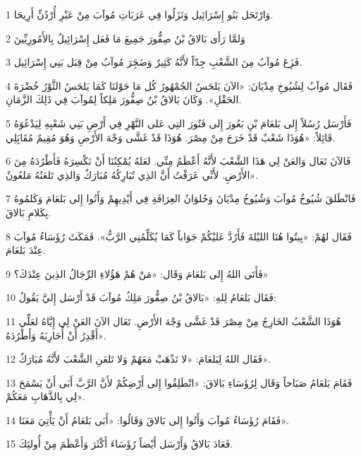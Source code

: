 \par 1 وَارْتَحَل بَنُو إِسْرَائِيل وَنَزَلُوا فِي عَرَبَاتِ مُوآبَ مِنْ عَبْرِ أُرْدُنِّ أَرِيحَا.
\par 2 وَلمَّا رَأَى بَالاقُ بْنُ صِفُّورَ جَمِيعَ مَا فَعَل إِسْرَائِيلُ بِالأَمُورِيِّينَ
\par 3 فَزَِعَ مُوآبُ مِنَ الشَّعْبِ جِدّاً لأَنَّهُ كَثِيرٌ وَضَجَِرَ مُوآبُ مِنْ قِبَل بَنِي إِسْرَائِيل.
\par 4 فَقَال مُوآبُ لِشُيُوخِ مِدْيَانَ: «الآنَ يَلحَسُ الجُمْهُورُ كُل مَا حَوْلنَا كَمَا يَلحَسُ الثَّوْرُ خُضْرَةَ الحَقْلِ». وَكَانَ بَالاقُ بْنُ صِفُّورَ مَلِكاً لِمُوآبَ فِي ذَلِكَ الزَّمَانِ.
\par 5 فَأَرْسَل رُسُلاً إِلى بَلعَامَ بْنِ بَعُورَ إِلى فَتُورَ التِي عَلى النَّهْرِ فِي أَرْضِ بَنِي شَعْبِهِ لِيَدْعُوَهُ قَائِلاً: «هُوَذَا شَعْبٌ قَدْ خَرَجَ مِنْ مِصْرَ. هُوَذَا قَدْ غَشَّى وَجْهَ الأَرْضِ وَهُوَ مُقِيمٌ مُقَابَِلِي.
\par 6 فَالآنَ تَعَال وَالعَنْ لِي هَذَا الشَّعْبَ لأَنَّهُ أَعْظَمُ مِنِّي. لعَلهُ يُمْكِنُنَا أَنْ نَكْسِرَهُ فَأَطْرُدَهُ مِنَ الأَرْضِ. لأَنِّي عَرَفْتُ أَنَّ الذِي تُبَارِكُهُ مُبَارَكٌ وَالذِي تَلعَنُهُ مَلعُونٌ».
\par 7 فَانْطَلقَ شُيُوخُ مُوآبَ وَشُيُوخُ مِدْيَانَ وَحُلوَانُ العِرَافَةِ فِي أَيْدِيهِمْ وَأَتُوا إِلى بَلعَامَ وَكَلمُوهُ بِكَلامِ بَالاقَ.
\par 8 فَقَال لهُمْ: «بِيتُوا هُنَا الليْلةَ فَأَرُدَّ عَليْكُمْ جَوَاباً كَمَا يُكَلِّمُنِي الرَّبُّ». فَمَكَثَ رُؤَسَاءُ مُوآبَ عِنْدَ بَلعَامَ.
\par 9 فَأَتَى اللهُ إِلى بَلعَامَ وَقَال: «مَنْ هُمْ هَؤُلاءِ الرِّجَالُ الذِينَ عِنْدَكَ؟»
\par 10 فَقَال بَلعَامُ لِلهِ: «بَالاقُ بْنُ صِفُّورَ مَلِكُ مُوآبَ قَدْ أَرْسَل إِليَّ يَقُولُ:
\par 11 هُوَذَا الشَّعْبُ الخَارِجُ مِنْ مِصْرَ قَدْ غَشَّى وَجْهَ الأَرْضِ. تَعَال الآنَ العَنْ لِي إِيَّاهُ لعَلِّي أَقْدِرُ أَنْ أُحَارِبَهُ وَأَطْرُدَهُ».
\par 12 فَقَال اللهُ لِبَلعَامَ: «لا تَذْهَبْ مَعَهُمْ وَلا تَلعَنِ الشَّعْبَ لأَنَّهُ مُبَارَكٌ».
\par 13 فَقَامَ بَلعَامُ صَبَاحاً وَقَال لِرُؤَسَاءِ بَالاقَ: «انْطَلِقُوا إِلى أَرْضِكُمْ لأَنَّ الرَّبَّ أَبَى أَنْ يَسْمَحَ لِي بِالذَّهَابِ مَعَكُمْ».
\par 14 فَقَامَ رُؤَسَاءُ مُوآبَ وَأَتُوا إِلى بَالاقَ وَقَالُوا: «أَبَى بَلعَامُ أَنْ يَأْتِيَ مَعَنَا».
\par 15 فَعَادَ بَالاقُ وَأَرْسَل أَيْضاً رُؤَسَاءَ أَكْثَرَ وَأَعْظَمَ مِنْ أُولئِكَ.
